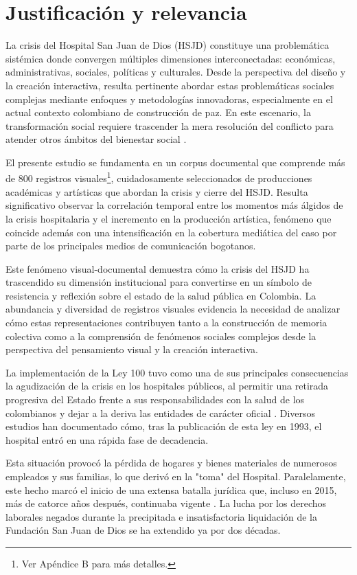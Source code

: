 \section*{Justificación y relevancia}

La crisis del Hospital San Juan de Dios (HSJD) constituye una problemática sistémica donde convergen múltiples dimensiones interconectadas: económicas, administrativas, sociales, políticas y culturales. Desde la perspectiva del diseño y la creación interactiva, resulta pertinente abordar estas problemáticas sociales complejas mediante enfoques y metodologías innovadoras, especialmente en el actual contexto colombiano de construcción de paz. En este escenario, la transformación social requiere trascender la mera resolución del conflicto para atender otros ámbitos del bienestar social \parencite[p. 313]{Capra1998}.

El presente estudio se fundamenta en un corpus documental que comprende más de 800 registros visuales\footnote{Ver Apéndice B para más detalles.}, cuidadosamente seleccionados de producciones académicas y artísticas que abordan la crisis y cierre del HSJD. Resulta significativo observar la correlación temporal entre los momentos más álgidos de la crisis hospitalaria y el incremento en la producción artística, fenómeno que coincide además con una intensificación en la cobertura mediática del caso por parte de los principales medios de comunicación bogotanos.

Este fenómeno visual-documental demuestra cómo la crisis del HSJD ha trascendido su dimensión institucional para convertirse en un símbolo de resistencia y reflexión sobre el estado de la salud pública en Colombia. La abundancia y diversidad de registros visuales evidencia la necesidad de analizar cómo estas representaciones contribuyen tanto a la construcción de memoria colectiva como a la comprensión de fenómenos sociales complejos desde la perspectiva del pensamiento visual y la creación interactiva.

La implementación de la Ley 100 tuvo como una de sus principales consecuencias la agudización de la crisis en los hospitales públicos, al permitir una retirada progresiva del Estado frente a sus responsabilidades con la salud de los colombianos y dejar a la deriva las entidades de carácter oficial \parencite{Castiblanco2017}. Diversos estudios han documentado cómo, tras la publicación de esta ley en 1993, el hospital entró en una rápida fase de decadencia.

Esta situación provocó la pérdida de hogares y bienes materiales de numerosos empleados y sus familias, lo que derivó en la "toma" del Hospital. Paralelamente, este hecho marcó el inicio de una extensa batalla jurídica que, incluso en 2015, más de catorce años después, continuaba vigente \parencite{Orlando2015}. La lucha por los derechos laborales negados durante la precipitada e insatisfactoria liquidación de la Fundación San Juan de Dios se ha extendido ya por dos décadas.

